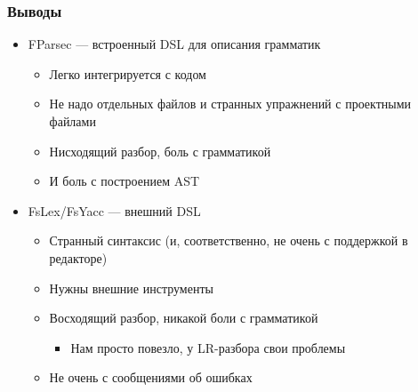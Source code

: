 \documentclass[xetex,mathserif,serif]{beamer}
\begin{document}
    \begin{frame}
        \frametitle{Выводы}
        \begin{itemize}
            \item FParsec --- встроенный DSL для описания грамматик
            \begin{itemize}
                \item Легко интегрируется с кодом
                \item Не надо отдельных файлов и странных упражнений с проектными файлами
                \item Нисходящий разбор, боль с грамматикой
                \item И боль с построением AST
            \end{itemize}
            \item FsLex/FsYacc --- внешний DSL
            \begin{itemize}
                \item Странный синтаксис (и, соответственно, не очень с поддержкой в редакторе)
                \item Нужны внешние инструменты
                \item Восходящий разбор, никакой боли с грамматикой
                \begin{itemize}
                    \item Нам просто повезло, у LR-разбора свои проблемы
                \end{itemize}
                \item Не очень с сообщениями об ошибках
            \end{itemize}
        \end{itemize}
    \end{frame}
\end{document}
